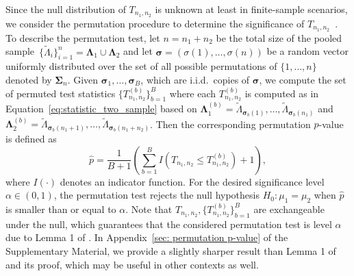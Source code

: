 \documentclass[12pt]{article}
\newcommand{\bfLambda}{\mathbf{\Lambda}}
\begin{document}
Since the null distribution of $T_{n_1,n_2}$ is unknown at least in finite-sample scenarios, we consider the permutation procedure to determine the significance of $T_{n_1,n_2}$~\citep{efron_introduction_1993-1}. To describe the permutation test, let $n = n_1 + n_2$ be the total size of the pooled sample~$\lbrace \tilde{\Lambda}_i \rbrace_{i=1}^n = \bfLambda_1 \cup \bfLambda_2$ and let $\boldsymbol{\sigma} = (\sigma(1),\ldots,\sigma(n))$ be a random vector uniformly distributed over the set of all possible permutations of $\{1,\ldots,n\}$ denoted by $\boldsymbol{\Sigma}_n$. Given $\boldsymbol{\sigma}_1,\ldots, \boldsymbol{\sigma}_B$, which are i.i.d.~copies of $\boldsymbol{\sigma}$, we compute the set of permuted test statistics $\{T_{n_1,n_2}^{(b)}\}_{b=1}^B$ where each $T_{n_1,n_2}^{(b)}$ is computed as in Equation~\eqref{eq:statistic_two_sample} based on $\bfLambda_1^{(b)} = \tilde{\Lambda}_{\boldsymbol{\sigma}_b(1)}, \ldots, \tilde{\Lambda}_{\boldsymbol{\sigma}_b(n_1)}$ and $\bfLambda_2^{(b)} = \tilde{\Lambda}_{\boldsymbol{\sigma}_b(n_1 + 1)}, \ldots, \tilde{\Lambda}_{\boldsymbol{\sigma}_b(n_1+n_2)}$. Then the corresponding permutation $p$-value is defined as 
\begin{equation}\label{eq:pvalue_twosample2}
	\hat{p}  = \frac{1}{B+1} \left( \sum_{b=1}^B I(T_{n_1,n_2} \leq T_{n_1,n_2}^{(b)}) + 1  \right),
\end{equation}
where $I(\cdot)$ denotes an indicator function. For the desired significance level $\alpha \in (0,1)$, the permutation test rejects the null hypothesis $H_0: \mu_1 = \mu_2$ when $\hat{p}$ is smaller than or equal to $\alpha$. Note that $T_{n_1,n_2},\{T_{n_1,n_2}^{(b)}\}_{b=1}^B$ are exchangeable under the null, which guarantees that the considered permutation test is level $\alpha$ due to Lemma 1 of \cite{romano2005exact}. In Appendix~\ref{sec: permutation p-value} of the Supplementary Material, we provide a slightly sharper result than Lemma 1 of \cite{romano2005exact} and its proof, which may be useful in other contexts as well.
\end{document}
